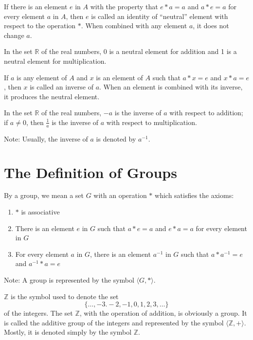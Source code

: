 \documentclass[12pt]{article}
\renewcommand{\times}{\ast}
\newcommand{\set}[1]{\{ #1 \}}
\newcommand{\group}[2]{\langle #1, #2 \rangle}
\newcommand{\integers}{\mathds{Z}}
\newcommand{\reals}{\mathds{R}}
\begin{document}
\begin{definition} If there is an element $e$ in $A$ with the property that $e \times a = a$ and $a \times e = a$ for every element $a$ in $A$, then $e$ is called an identity of ``neutral'' element with respect to the operation $\times$. When combined with any element $a$, it does not change $a$. \end{definition} 

\begin{example} In the set $\reals$ of the real numbers, 0 is a neutral element for addition and 1 is a neutral element for multiplication. \end{example} 

\begin{definition} If $a$ is any element of $A$ and $x$ is an element of $A$ such that $a \times x = e$ and $x \times a = e$, then $x$ is called an inverse of $a$. When an element is combined with its inverse, it produces the neutral element. \end{definition} 

\begin{example} In the set $\reals$ of the real numbers, $-a$ is the inverse of $a$ with respect to addition; if $a \neq 0$, then $\frac{1}{a}$ is the inverse of $a$ with respect to multiplication. \end{example} 
Note: Usually, the inverse of $a$ is denoted by $a^{-1}$. 


\section{The Definition of Groups} 

\begin{definition} By a group, we mean a set $G$ with an operation $\times$ which satisfies the axioms: 
\begin{enumerate} 
\item $\times$ is associative 
\item There is an element $e$ in $G$ such that $a \times e = a$ and $e \times a = a$ for every element in $G$ 
\item For every element $a$ in $G$, there is an element $a^{-1}$ in $G$ such that $a \times a^{-1} = e$ and $a^{-1} \times a = e$ \end{enumerate} \end{definition}

 Note: A group is represented by the symbol $\group{G}{\times}$. 
 
 \begin{example} $\integers$ is the symbol used to denote the set $$\set{\dots, -3. -2, -1, 0, 1, 2, 3, \dots} $$ of the integers. The set $\integers$, with the operation of addition, is obviously a group. It is called the additive group of the integers and represented by the symbol $\group{\integers}{+}$. Mostly, it is denoted simply by the symbol $\integers$. \end{example} 
 
\end{document}

